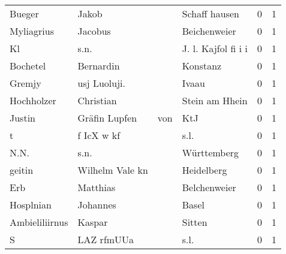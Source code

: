 \begin{center}
\begin{tiny}
\begin{longtabu}{llllrr}
                   Bueger &                              Jakob &             &                               Schaff hausen &          0 &         1 \\
               Myliagrius &                            Jacobus &             &                                Beichenweier &          0 &         1 \\
                       Kl &                               s.n. &             &                         J. l. Kajfol fi i i &          0 &         1 \\
                 Bochetel &                          Bernardin &             &                                    Konstanz &          0 &         1 \\
                   Gremjy &                       usj Luoluji. &             &                                       Ivaau &          0 &         1 \\
               Hochholzer &                          Christian &             &                              Stein am Hhein &          0 &         1 \\
                   Justin &                     Gräfin  Lupfen &         von &                                         KtJ &          0 &         1 \\
                        t &                         f IcX w kf &             &                                        s.l. &          0 &         1 \\
                     N.N. &                               s.n. &             &                                 Württemberg &          0 &         1 \\
                   geitin &                    Wilhelm Vale kn &             &                                  Heidelberg &          0 &         1 \\
                      Erb &                           Matthias &             &                                Belchenweier &          0 &         1 \\
                Hosplnian &                           Johannes &             &                                       Basel &          0 &         1 \\
           Ambieliliirnus &                             Kaspar &             &                                      Sitten &          0 &         1 \\
                        S &                         LAZ rfmUUa &             &                                        s.l. &          0 &         1 \\

\end{longtabu}
\end{tiny}
\end{center}
